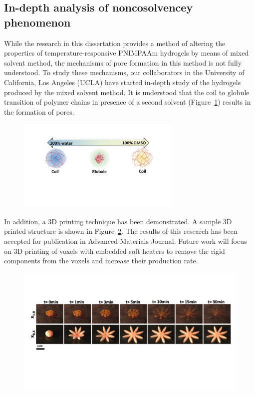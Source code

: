 \subsection{In-depth analysis of noncosolvencey phenomenon}
While the research in this dissertation provides a method of altering the properties of  temperature-responsive PNIMPAAm hydrogels by means of mixed solvent method, the mechanisms of pore formation in this method is not fully understood. To study these mechanisms, our collaborators in the University of California, Los Angeles (UCLA) have started in-depth study of the hydrogels produced by the mixed solvent method. It is understood that the coil to globule transition of polymer chains in presence of a second solvent (Figure~\ref{fig:cononsolv}) results in the formation of pores. 
\begin{figure}[!ht]
\centering
\includegraphics[width=0.7\textwidth]{cononsolv.pdf}
    \caption[]{}
    \label{fig:cononsolv}
\end{figure}

In addition, a 3D printing technique has been demonstrated. A sample 3D printed structure is shown in Figure~\ref{fig:3Dprint}. The results of this research has been accepted for publication in Advanced Materials Journal. Future work will focus on 3D printing of voxels with embedded soft heaters to remove the rigid components from the voxels and increase their production rate.
\begin{figure}[!ht]
\centering
\includegraphics[width=\textwidth]{3Dprint.pdf}
    \caption[]{}
    \label{fig:3Dprint}
\end{figure}

